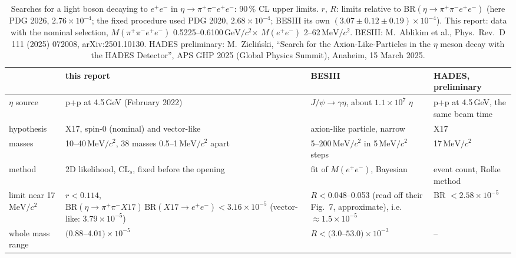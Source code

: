 \documentclass[11pt,a4paper]{article}
\newcommand{\ee}{\ensuremath{e^{+}e^{-}}\xspace}
\newcommand{\pipi}{\ensuremath{\pi^{+}\pi^{-}}\xspace}
\newcommand{\ppee}{\ensuremath{\pi^{+}\pi^{-}e^{+}e^{-}}\xspace}
\newcommand{\Mfour}{\ensuremath{M(\pi^{+}\pi^{-}e^{+}e^{-})}\xspace}
\newcommand{\Mee}{\ensuremath{M(e^{+}e^{-})}\xspace}
\newcommand{\GeVcc}{\ensuremath{\mathrm{GeV}/c^{2}}\xspace}
\newcommand{\MeVcc}{\ensuremath{\mathrm{MeV}/c^{2}}\xspace}
\newcommand{\BRX}{\ensuremath{\mathrm{BR}(\eta\to\pipi X17)\,\mathrm{BR}(X17\to\ee)}\xspace}
\begin{document}
\begin{table}[!htbp]
\centering
\caption{Searches for a light boson decaying to \ee in $\eta\to\pipi\ee$: 90\,\% CL upper limits. $r$, $R$: limits relative to
BR$(\eta\to\ppee)$ (here PDG 2026, $2.76\times10^{-4}$; the fixed procedure used PDG 2020, $2.68\times10^{-4}$; BESIII its own
$(3.07\pm0.12\pm0.19)\times10^{-4}$). This report: data with the nominal selection, \Mfour 0.5225--0.6100\,\GeVcc $\times$ \Mee 2--62\,\MeVcc.
BESIII: M.~Ablikim et al., Phys.\ Rev.\ D 111 (2025) 072008, arXiv:2501.10130. HADES preliminary: M.~Zieli\'nski, ``Search for the
Axion-Like-Particles in the $\eta$ meson decay with the HADES Detector'', APS GHP 2025 (Global Physics Summit), Anaheim, 15 March 2025.}
\label{tab:x17other}
\footnotesize
\begin{tabularx}{\textwidth}{@{}>{\raggedright\arraybackslash}p{2.4cm} L L L@{}}
\toprule
 & this report & BESIII & HADES, preliminary \\
\midrule
$\eta$ source & p+p at 4.5\,GeV (February 2022) & $J/\psi\to\gamma\eta$, about $1.1\times10^7$ $\eta$ & p+p at 4.5\,GeV, the same beam time \\
hypothesis & X17, spin-0 (nominal) and vector-like & axion-like particle, narrow & X17 \\
masses & 10--40\,\MeVcc, 38 masses 0.5--1\,\MeVcc apart & 5--200\,\MeVcc in 5\,\MeVcc steps & 17\,\MeVcc \\
method & 2D likelihood, CL$_s$, fixed before the opening & fit of \Mee, Bayesian & event count, Rolke method \\
limit near 17\,\MeVcc & $r<0.114$, $\BRX<3.16\times10^{-5}$ (vector-like: $3.79\times10^{-5}$) & $R<0.048$--0.053 (read off their Fig.~7,
approximate), i.e.\ $\approx1.5\times10^{-5}$ & BR $<2.58\times10^{-5}$ \\
whole mass range & $(0.88$--$4.01)\times10^{-5}$ & $R<(3.0$--$53.0)\times10^{-3}$ & -- \\
\bottomrule
\end{tabularx}
\end{table}

\end{document}
